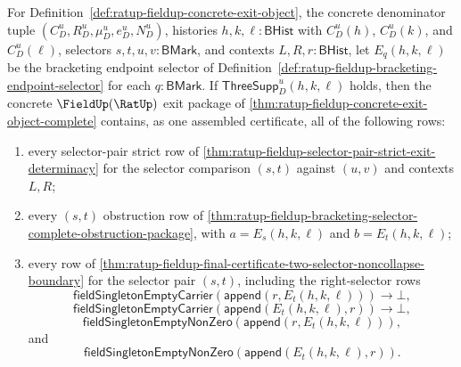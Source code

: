 \begin{theorem}
\label{thm:ratup-fieldup-complete-selector-exit-obstruction-certificate}
For Definition~\ref{def:ratup-fieldup-concrete-exit-object}, the concrete
denominator tuple $(C_D^u,R_D^u,\mu_D^u,e_D^u,N_D^u)$, histories
$h,k,\ell:\mathsf{BHist}$ with $C_D^u(h)$, $C_D^u(k)$, and $C_D^u(\ell)$,
selectors $s,t,u,v:\mathsf{BMark}$, and contexts $L,R,r:\mathsf{BHist}$, let
$E_q(h,k,\ell)$ be the bracketing endpoint selector of
Definition~\ref{def:ratup-fieldup-bracketing-endpoint-selector} for each
$q:\mathsf{BMark}$. If $\mathsf{ThreeSupp}_D^u(h,k,\ell)$ holds, then the
concrete $\FieldUp(\RatUp)$ exit package of
\autoref{thm:ratup-fieldup-concrete-exit-object-complete} contains, as one
assembled certificate, all of the following rows:
\begin{enumerate}
  \item every selector-pair strict row of
  \autoref{thm:ratup-fieldup-selector-pair-strict-exit-determinacy} for the
  selector comparison $(s,t)$ against $(u,v)$ and contexts $L,R$;
  \item every $(s,t)$ obstruction row of
  \autoref{thm:ratup-fieldup-bracketing-selector-complete-obstruction-package},
  with $a=E_s(h,k,\ell)$ and $b=E_t(h,k,\ell)$;
  \item every row of
  \autoref{thm:ratup-fieldup-final-certificate-two-selector-noncollapse-boundary}
  for the selector pair $(s,t)$, including the right-selector rows
  $$
  \mathsf{fieldSingletonEmptyCarrier}(\mathsf{append}(r,E_t(h,k,\ell)))\to\bot,
  $$
  $$
  \mathsf{fieldSingletonEmptyCarrier}(\mathsf{append}(E_t(h,k,\ell),r))\to\bot,
  $$
  $$
  \mathsf{fieldSingletonEmptyNonZero}(\mathsf{append}(r,E_t(h,k,\ell))),
  $$
  and
  $$
  \mathsf{fieldSingletonEmptyNonZero}(\mathsf{append}(E_t(h,k,\ell),r)).
  $$
\end{enumerate}
\end{theorem}
